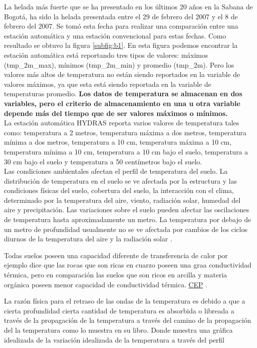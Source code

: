 La helada más fuerte que se ha presentado en los últimos 20 años en la Sabana de Bogotá, ha sido la helada presentada entre el 29 de febrero del 2007 y el 8 de febrero del 2007. Se tomó esta fecha para realizar una comparación entre una estación automática y una estación convencional para estas fechas. Como resultado se obtuvo la figura \ref{subfig:b1}. En esta figura podemos encontrar la estación automática está reportando tres tipos de valores: máximos (tmp\_2m\_max), mínimos (tmp\_2m\_min) y promedio (tmp\_2m). Pero los valores más altos de temperatura no están siendo reportados en la variable de valores máximos, ya que esta está siendo reportada en la variable de temperaturas promedio. \textbf{Los datos de temperatura se almacenan en dos variables, pero el criterio de almacenamiento en una u otra variable depende más del tiempo que de ser valores máximos o mínimos.}\\


La estación automática HYDRAS reporta varios valores de temperatura tales como: temperatura a 2 metros, temperatura máxima a dos metros, temperatura mínima a dos metros, temperatura a 10 cm, temperatura máxima a 10 cm, temperatura mínima a 10 cm, temperatura a 10 cm bajo el suelo, temperatura a 30 cm bajo el suelo y temperatura a 50 centímetros bajo el suelo.\\

Las condiciones ambientales afectan el perfil de temperatura del suelo. La distribución de temperatura en el suelo se ve afectada por la estructura y las condiciones físicas del suelo, cobertura del suelo, la interacción con el clima, determinado por la temperatura del aire, viento, radiación solar, humedad del aire y precipitación. Las variaciones sobre el suelo pueden afectar las oscilaciones de temperatura hasta aproximadamente un metro. La temperatura por debajo de  un metro de profundidad usualmente no se ve afectada por cambios de los ciclos diurnos de la temperatura del aire y la radiación solar \citep{florides2005}.

Todas suelos poseen una capacidad diferente de transferencia de calor por ejemplo \citet{florides2005} dice que las rocas que son ricas en cuarzo poseen una graa conductividad térmica, pero en comparación las suelos que son ricos en arcilla y materia orgánica poseen menor capacidad de conductividad térmica. \textcolor{blue}{ \href{http://ces.iisc.ernet.in/hpg/envis/Remote/section994.htm}{CEP}} \citep{CES2000}.

La razón física para el retraso de las ondas de la temperatura es debido a que a cierta profundidad cierta cantidad de temperatura es absorbida o libreada a través de la propagación de la temperatura a través del camino de la propagación del la temperatura como lo muestra \citet{hillel2013} en su libro. Donde muestra una gráfica idealizada de la variación idealizada de la temperatura a través del perfil 

